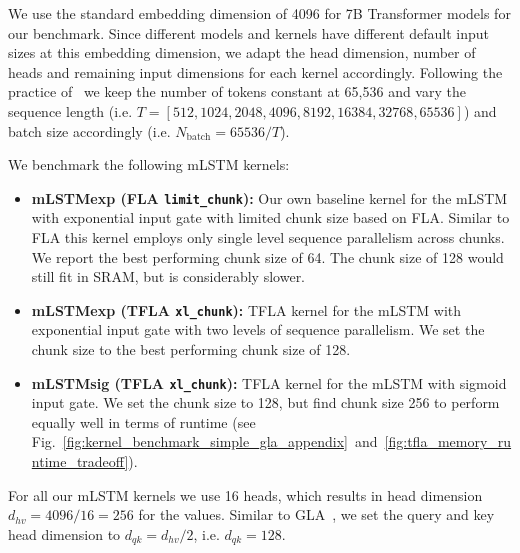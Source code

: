 \documentclass{article}
\begin{document}
    We use the standard embedding dimension of 4096 for 7B Transformer models for our benchmark.
    Since different models and kernels have different default input sizes at this embedding dimension, we adapt the head dimension, number of heads and remaining input dimensions for each kernel accordingly.
    Following the practice of~\citet{shah:24flashattention3} we keep the number of tokens constant at 65,536 and vary the sequence length (i.e. $T=[512, 1024, 2048, 4096, 8192, 16384, 32768, 65536]$) and batch size accordingly (i.e. $N_{\text{batch}}=65536/T$).

    We benchmark the following mLSTM kernels:
    \vspace{-0.2cm}
    \begin{itemize}
        \item \textbf{mLSTMexp (FLA \texttt{limit\_chunk}):} Our own baseline kernel for the mLSTM with exponential input gate with limited chunk size based on FLA. Similar to FLA this kernel employs only single level sequence parallelism across chunks. We report the best performing chunk size of 64.
              The chunk size of 128 would still fit in SRAM, but is considerably slower.
        \item \textbf{mLSTMexp (TFLA \texttt{xl\_chunk}):} TFLA kernel for the mLSTM with exponential input gate with two levels of sequence parallelism.
              We set the chunk size to the best performing chunk size of 128.
        \item \textbf{mLSTMsig (TFLA \texttt{xl\_chunk}):} TFLA kernel for the mLSTM with sigmoid input gate. We set the chunk size to 128, but find chunk size 256 to perform equally well in terms of runtime (see Fig.~\ref{fig:kernel_benchmark_simple_gla_appendix}~and~\ref{fig:tfla_memory_runtime_tradeoff}).
    \end{itemize}

    For all our mLSTM kernels we use 16 heads, which results in head dimension $d_{hv}=4096/16=256$ for the values.
    Similar to GLA~\citep{yang:24gated}, we set the query and key head dimension to $d_{qk}=d_{hv} / 2$, i.e. $d_{qk}=128$.
\end{document}
